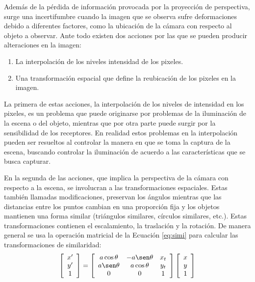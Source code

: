 \par Además de la pérdida de información provocada por la proyección de perspectiva, surge una incertifumbre cuando la imagen que se observa sufre deformaciones debido a diferentes factores, como la ubicación de la cámara con respecto al objeto a observar. Ante todo existen dos acciones por las que se pueden producir alteraciones en la imagen:
\begin{enumerate}
	\item La interpolación de los niveles intensidad de los pixeles.
	\item Una transformación espacial que define la reubicación de los pixeles en la imagen.
\end{enumerate}
\par La primera de estas acciones, la interpolación de los niveles de intensidad en los pixeles, es un problema que puede originarse por problemas de la iluminación de la escena o del objeto, mientras que por otra parte puede surgir por la sensibilidad de los receptores. En realidad estos problemas en la interpolación pueden ser resueltos al controlar la manera en que se toma la captura de la escena, buscando controlar la iluminación de acuerdo a las características que se busca capturar.
\par En la segunda de las acciones, que implica la perspectiva de la cámara con respecto a la escena, se involucran a las transformaciones espaciales. Estas también llamadas modificaciones, preservan los ángulos mientras que las distancias entre los puntos cambian en una proporción fija y los objetos mantienen una forma similar (triángulos similares, círculos similares, etc.). Estas transformaciones contienen el escalamiento, la traslación y la rotación. De manera general se usa la operación matricial de la Ecuación \eqref{eq:simi} para calcular las transformaciones de similaridad:
\begin{equation}\label{eq:simi}
	\left[\begin{array}{c}
	x'\\
	y'\\
	1
	\end{array}\right]=
	\left[\begin{array}{ccc}
	a\cos\theta & -a\sen\theta & x_{t}\\
	a\sen\theta & a\cos\theta & y_{t}\\
	0 & 0 & 1
	\end{array}\right]
	\left[\begin{array}{c}
	x\\
	y\\
	1
	\end{array}\right]
\end{equation}
